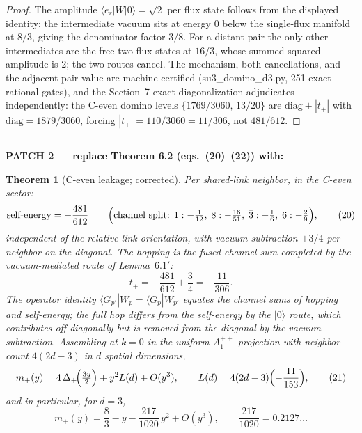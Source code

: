 \documentclass[11pt]{article}
\newtheorem{theorem}{Theorem}[section]
\begin{document}
\begin{proof}
The amplitude $\langle e_r|W|0\rangle=\sqrt2$ per flux state follows from the
displayed identity; the intermediate vacuum sits at energy $0$ below the
single-flux manifold at $8/3$, giving the denominator factor $3/8$. For a
distant pair the only other intermediates are the free two-flux states at
$16/3$, whose summed squared amplitude is $2$; the two routes cancel. The
mechanism, both cancellations, and the adjacent-pair value are
machine-certified (su3\_domino\_d3.py, 251 exact-rational gates), and the
Section~7 exact diagonalization adjudicates independently: the C-even domino
levels $\{1769/3060,\,13/20\}$ are
$\text{diag}\pm|t_+|$ with $\text{diag}=1879/3060$, forcing
$|t_+|=110/3060=11/306$, not $481/612$.
\end{proof}

\medskip\hrule\medskip
\noindent\textbf{PATCH 2 --- replace Theorem 6.2 (eqs.\ (20)--(22)) with:}

\begin{theorem}[C-even leakage; corrected]\label{thm:62corr}
Per shared-link neighbor, in the C-even sector:
\begin{equation}
\text{self-energy}=-\frac{481}{612}
\qquad\Bigl(\text{channel split: }
1:-\tfrac1{12},\;8:-\tfrac{16}{51},\;\bar3:-\tfrac16,\;6:-\tfrac29\Bigr),
\tag{20}
\end{equation}
independent of the relative link orientation, with vacuum subtraction $+3/4$
per neighbor on the diagonal. The hopping is the fused-channel sum
\emph{completed by the vacuum-mediated route of Lemma~$6.1'$}:
\begin{equation}
t_+=-\frac{481}{612}+\frac34=-\frac{11}{306}.
\tag{$20'$}
\end{equation}
The operator identity
$\langle G_{p'}|W_p=\langle G_p|W_{p'}$ equates the \emph{channel sums} of
hopping and self-energy; the full hop differs from the self-energy by the
$|0\rangle$ route, which contributes off-diagonally but is removed from the
diagonal by the vacuum subtraction. Assembling at $k=0$ in the uniform
$A_1^{++}$ projection with neighbor count $4(2d-3)$ in $d$ spatial
dimensions,
\begin{equation}
m_+(y)=4\,\Delta_+\!\Bigl(\tfrac{3y}{2}\Bigr)+y^2 L(d)+O(y^3),
\qquad
L(d)=4(2d-3)\Bigl(-\frac{11}{153}\Bigr),
\tag{21}
\end{equation}
and in particular, for $d=3$,
\begin{equation}
m_+(y)=\frac83-y-\frac{217}{1020}\,y^2+O(y^3),
\qquad \frac{217}{1020}=0.2127\ldots
\tag{22}
\end{equation}
\end{theorem}
\end{document}

